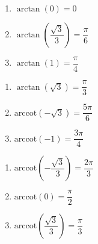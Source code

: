 \begin{multicols}{3} 

\begin{enumerate}

\setcounter{enumi}{\value{HW}}

\item $\arctan \left( 0 \right) = 0$ 
\item $\arctan \left( \dfrac{\sqrt{3}}{3} \right) = \dfrac{\pi}{6}$
\item $\arctan \left( 1 \right) = \dfrac{\pi}{4}$ 

\setcounter{HW}{\value{enumi}}

\end{enumerate}

\end{multicols}

\begin{multicols}{3} 

\begin{enumerate}

\setcounter{enumi}{\value{HW}}

\item $\arctan \left( \sqrt{3} \right) = \dfrac{\pi}{3}$ 
\item $\mbox{arccot} \left( -\sqrt{3} \right) = \dfrac{5\pi}{6}$
\item $\mbox{arccot} \left( -1 \right) = \dfrac{3\pi}{4}$

\setcounter{HW}{\value{enumi}}

\end{enumerate}

\end{multicols}

\begin{multicols}{3} 

\begin{enumerate}

\setcounter{enumi}{\value{HW}}

\item $\mbox{arccot} \left( -\dfrac{\sqrt{3}}{3} \right) = \dfrac{2\pi}{3}$
\item $\mbox{arccot} \left( 0 \right) = \dfrac{\pi}{2}$ 
\item $\mbox{arccot} \left( \dfrac{\sqrt{3}}{3} \right) = \dfrac{\pi}{3}$

\setcounter{HW}{\value{enumi}}

\end{enumerate}

\end{multicols}


